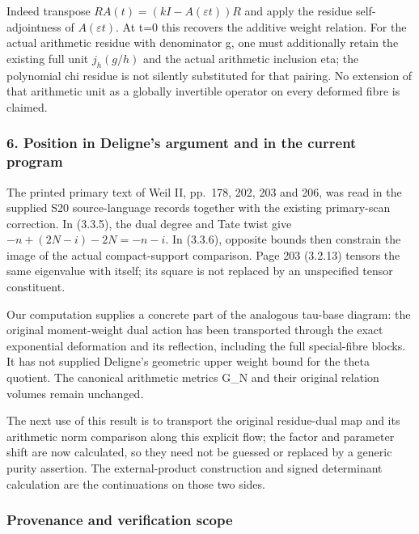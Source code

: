 Indeed transpose \(RA(t)=(kI-A(\varepsilon t))R\) and apply the residue self-adjointness of \(A(\varepsilon t)\). At t=0 this recovers the additive weight relation. For the actual arithmetic residue with denominator g, one must additionally retain the existing full unit \(j_h(g/h)\) and the actual arithmetic inclusion eta; the polynomial chi residue is not silently substituted for that pairing. No extension of that arithmetic unit as a globally invertible operator on every deformed fibre is claimed.

\subsubsection{6. Position in Deligne's argument and in the current program}\label{endpoint-f1_reflection--position-in-delignes-argument-and-in-the-current-program}

The printed primary text of Weil II, pp.~178, 202, 203 and 206, was read in the supplied S20 source-language records together with the existing primary-scan correction. In (3.3.5), the dual degree and Tate twist give \(-n+(2N-i)-2N=-n-i\). In (3.3.6), opposite bounds then constrain the image of the actual compact-support comparison. Page 203 (3.2.13) tensors the same eigenvalue with itself; its square is not replaced by an unspecified tensor constituent.

Our computation supplies a concrete part of the analogous tau-base diagram: the original moment-weight dual action has been transported through the exact exponential deformation and its reflection, including the full special-fibre blocks. It has not supplied Deligne's geometric upper weight bound for the theta quotient. The canonical arithmetic metrics G\_N and their original relation volumes remain unchanged.

The next use of this result is to transport the original residue-dual map and its arithmetic norm comparison along this explicit flow; the factor and parameter shift are now calculated, so they need not be guessed or replaced by a generic purity assertion. The external-product construction and signed determinant calculation are the continuations on those two sides.

\subsubsection{Provenance and verification scope}\label{endpoint-f1_reflection--provenance-and-verification-scope}

